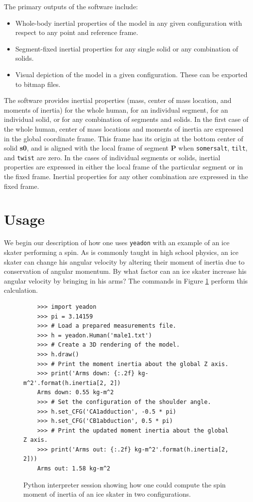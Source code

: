 \documentclass[10pt,a4paper,twocolumn]{article}
\begin{document}
The primary outputs of the software include:

\begin{itemize}
  \item Whole-body inertial properties of the model in any given configuration
      with respect to any point and reference frame.
  \item Segment-fixed inertial properties for any single solid or any
    combination of solids.
  \item Visual depiction of the model in a given configuration. These can be
    exported to bitmap files.
\end{itemize}

The software provides inertial properties (mass, center of mass location, and moments of
inertia) for the whole human, for an individual segment, for an individual
solid, or for any combination of segments and solids. In the first case of the
whole human, center of mass locations and moments of inertia are expressed in the global coordinate frame. This frame has its origin at the bottom center of solid
\textbf{s0}, and is aligned with the local frame of segment \textbf{P} when
\verb+somersalt+, \verb+tilt+, and \verb+twist+ are zero. In the cases of
individual segments or solids, inertial properties are expressed in either
the local frame of the particular segment or in the fixed frame. Inertial properties for any other combination are expressed in the fixed frame.

\section*{Usage}
\label{sec:usage}

We begin our description of how one uses \verb+yeadon+ with an example of an
ice skater performing a spin. As is commonly taught in high school physics, 
an ice skater can change his angular velocity by altering their moment of
inertia due to conservation of angular momentum. By what factor can an ice skater increase his angular velocity
by bringing in his arms? The commands in Figure \ref{fig:ice-skate-code} perform this calculation.

\begin{figure}
  \begin{verbatim}
    >>> import yeadon
    >>> pi = 3.14159
    >>> # Load a prepared measurements file.
    >>> h = yeadon.Human('male1.txt')
    >>> # Create a 3D rendering of the model.
    >>> h.draw()
    >>> # Print the moment inertia about the global Z axis.
    >>> print('Arms down: {:.2f} kg-m^2'.format(h.inertia[2, 2])
    Arms down: 0.55 kg-m^2
    >>> # Set the configuration of the shoulder angle.
    >>> h.set_CFG('CA1adduction', -0.5 * pi)
    >>> h.set_CFG('CB1abduction', 0.5 * pi)
    >>> # Print the updated moment inertia about the global Z axis.
    >>> print('Arms out: {:.2f} kg-m^2'.format(h.inertia[2, 2]))
    Arms out: 1.58 kg-m^2
  \end{verbatim}
  \caption{Python interpreter session showing how one could compute the spin moment of inertia of an ice skater in two configurations.
  }
  \label{fig:ice-skate-code}
\end{figure}
\end{document}
